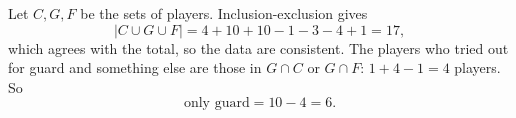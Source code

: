 Let $C,G,F$ be the sets of players. Inclusion-exclusion gives
\[
|C\cup G\cup F|=4+10+10-1-3-4+1=17,
\]
which agrees with the total, so the data are consistent. The players who tried out for guard and something else are those in $G\cap C$ or $G\cap F$: $1+4-1=4$ players. So
\[
\text{only guard}=10-4=\boxed{6}.
\]
